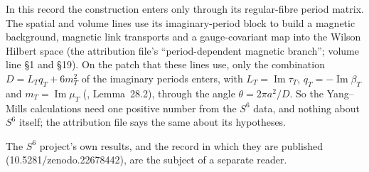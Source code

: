 In this record the construction enters only through its regular-fibre period matrix. The spatial and volume lines use its imaginary-period block to build a magnetic background, magnetic link transports and a gauge-covariant map into the Wilson Hilbert space (the attribution file's ``period-dependent magnetic branch''; volume line §1 and §19). On the patch that these lines use, only the combination $D=L_Tq_T+6m_T^2$ of the imaginary periods enters, with $L_T=\operatorname{Im}\tau_T$, $q_T=-\operatorname{Im}\beta_T$ and $m_T=\operatorname{Im}\mu_T$ (, Lemma~28.2), through the angle $\theta=2\pi a^2/D$. So the Yang--Mills calculations need one positive number from the $S^6$ data, and nothing about $S^6$ itself; the attribution file says the same about its hypotheses.

The $S^6$ project's own results, and the record in which they are published (10.5281/zenodo.22678442), are the subject of a separate reader.
